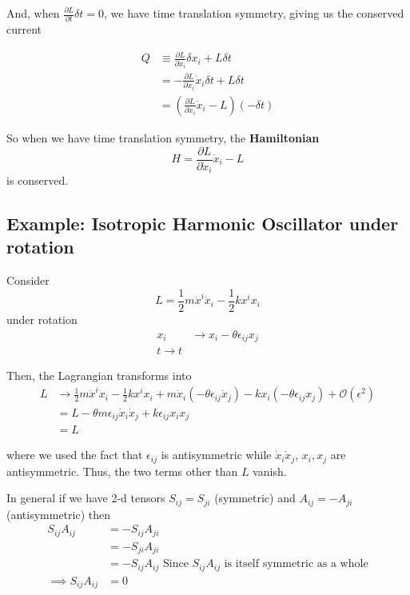 \documentclass[11pt]{article}
\begin{document}
\vskip 0.5cm
And, when $ \frac{\partial L}{\partial t} \delta t  = 0$, we have time translation symmetry, giving us the conserved current

\begin{align*}
  Q &\equiv  \frac{\partial L}{\partial \dot{x}_i} \delta x_i + L \delta t \\
  &= -  \frac{\partial L}{\partial \dot{x}_i} \dot{x}_i \delta t  +  L \delta t \\
  &= \left(  \frac{\partial L}{\partial \dot{x}_i} \dot{x}_i - L \right) \left(- \delta t\right)
\end{align*}

\vskip 0.5cm
\begin{bluebox}
So when we have time translation symmetry, the \textbf{Hamiltonian}
\[ H =  \frac{\partial L}{\partial \dot{x}_i} \dot{x}_i - L  \]
is conserved.
\end{bluebox}

\vskip 0.5cm
\subsection{Example: Isotropic Harmonic Oscillator under rotation}
Consider 
\[ L = \frac{1}{2}m \dot{x}^i \dot{x}_i - \frac{1}{2}k x^i x_i \]
under rotation
\begin{align*}
  x_i &\rightarrow x_i - \theta \epsilon_{ij} x_j \\
  t \rightarrow t
\end{align*}

Then, the Lagrangian transforms into 
\begin{align*}
  L &\rightarrow \frac{1}{2}m \dot{x}^i \dot{x}_i - \frac{1}{2}k x^i x_i + m\dot{x}_i \left(-\theta \epsilon_{ij} \dot{x}_j\right) - kx_i \left(-\theta \epsilon_{ij} x_j\right) + \mathcal{O}(\epsilon^2) \\
  &= L - \theta m \epsilon_{ij} \dot{x}_i \dot{x}_j + k \epsilon_{ij} x_{i} x_{j} \\
  &= L
\end{align*}

where we used the fact that $\epsilon_{ij}$ is antisymmetric while $\dot{x}_i \dot{x}_j$, $x_i, x_j$ are antisymmetric. Thus, 
the two terms other than $L$ vanish.

\begin{redbox}
  In general if we have 2-d tensors $S_{ij} = S_{ji}$ (symmetric) and $A_{ij} = -A_{ji}$ (antisymmetric) then 
  \begin{align*}
    S_{ij} A_{ij} &= -S_{ij} A_{ji} \\
    &= -S_{ji} A_{ji} \\
    &= -S_{ij} A_{ij} \text{ Since $S_{ij} A_{ij}$ is itself symmetric as a whole} \\
    \implies S_{ij} A_{ij} &= 0
  \end{align*}
\end{redbox}
\end{document}
